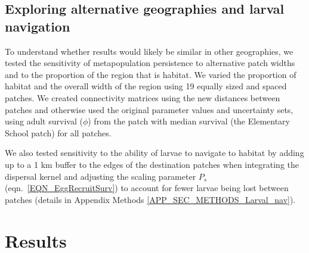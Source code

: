 \documentclass[12pt, oneside]{article}   	%
\begin{document}
\subsection*{Exploring alternative geographies and larval navigation}

To understand whether results would likely be similar in other geographies, we tested the sensitivity of metapopulation persistence to alternative patch widths and to the proportion of the region that is habitat. We varied the proportion of habitat and the overall width of the region using 19 equally sized and spaced patches. We created connectivity matrices using the new distances between patches and otherwise used the original parameter values and uncertainty sets, using adult survival ($\phi$) from the patch with median survival (the Elementary School patch) for all patches.

We also tested sensitivity to the ability of larvae to navigate to habitat by adding up to a 1 km buffer to the edges of the destination patches when integrating the dispersal kernel and adjusting the scaling parameter $P_s$ (eqn.\ \ref{EQN_EggRecruitSurv}) to account for fewer larvae being lost between patches (details in Appendix Methods \ref{APP_SEC_METHODS_Larval_nav}).

\section*{Results} %

\end{document}

